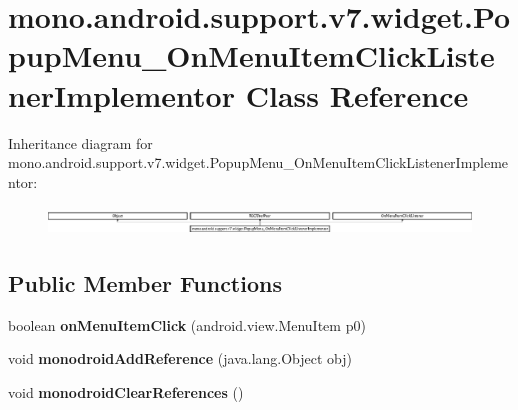 \hypertarget{classmono_1_1android_1_1support_1_1v7_1_1widget_1_1_popup_menu___on_menu_item_click_listener_implementor}{}\section{mono.\+android.\+support.\+v7.\+widget.\+Popup\+Menu\+\_\+\+On\+Menu\+Item\+Click\+Listener\+Implementor Class Reference}
\label{classmono_1_1android_1_1support_1_1v7_1_1widget_1_1_popup_menu___on_menu_item_click_listener_implementor}
Inheritance diagram for mono.\+android.\+support.\+v7.\+widget.\+Popup\+Menu\+\_\+\+On\+Menu\+Item\+Click\+Listener\+Implementor\+:\begin{figure}[H]
\begin{center}
\leavevmode
\includegraphics[height=0.760353cm]{classmono_1_1android_1_1support_1_1v7_1_1widget_1_1_popup_menu___on_menu_item_click_listener_implementor}
\end{center}
\end{figure}
\subsection*{Public Member Functions}
\begin{DoxyCompactItemize}
\item 
\mbox{\label{classmono_1_1android_1_1support_1_1v7_1_1widget_1_1_popup_menu___on_menu_item_click_listener_implementor_a62249f352c854b62e49a42bc6ea79c70}} 
boolean {\bfseries on\+Menu\+Item\+Click} (android.\+view.\+Menu\+Item p0)
\item 
\mbox{\label{classmono_1_1android_1_1support_1_1v7_1_1widget_1_1_popup_menu___on_menu_item_click_listener_implementor_a10bc60fb24f62110461d25542b950567}} 
void {\bfseries monodroid\+Add\+Reference} (java.\+lang.\+Object obj)
\item 
\mbox{\label{classmono_1_1android_1_1support_1_1v7_1_1widget_1_1_popup_menu___on_menu_item_click_listener_implementor_afb02baf1ac72557754370a95de87f423}} 
void {\bfseries monodroid\+Clear\+References} ()
\end{DoxyCompactItemize}
